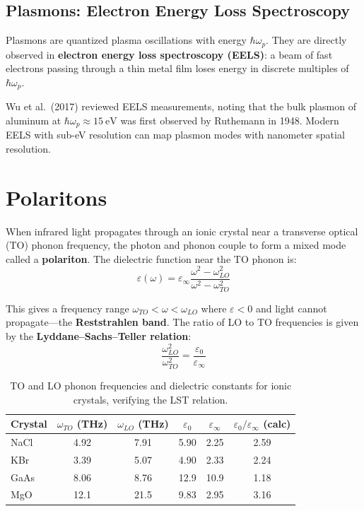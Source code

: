 \subsection{Plasmons: Electron Energy Loss Spectroscopy}

Plasmons are quantized plasma oscillations with energy $\hbar\omega_p$. They are directly observed in \textbf{electron energy loss spectroscopy (EELS)}: a beam of fast electrons passing through a thin metal film loses energy in discrete multiples of $\hbar\omega_p$.

Wu et al.\ (2017) reviewed EELS measurements, noting that the bulk plasmon of aluminum at $\hbar\omega_p \approx \SI{15}{\electronvolt}$ was first observed by Ruthemann in 1948. Modern EELS with sub-\si{\electronvolt} resolution can map plasmon modes with nanometer spatial resolution.


\section{Polaritons}

When infrared light propagates through an ionic crystal near a transverse optical (TO) phonon frequency, the photon and phonon couple to form a mixed mode called a \textbf{polariton}. The dielectric function near the TO phonon is:
\begin{equation}
  \varepsilon(\omega) = \varepsilon_\infty \frac{\omega^2 - \omega_{LO}^2}{\omega^2 - \omega_{TO}^2}
\end{equation}

This gives a frequency range $\omega_{TO} < \omega < \omega_{LO}$ where $\varepsilon < 0$ and light cannot propagate---the \textbf{Reststrahlen band}. The ratio of LO to TO frequencies is given by the \textbf{Lyddane--Sachs--Teller relation}:
\begin{equation}
  \frac{\omega_{LO}^2}{\omega_{TO}^2} = \frac{\varepsilon_0}{\varepsilon_\infty}
\end{equation}

\begin{table}[H]
\centering
\caption{TO and LO phonon frequencies and dielectric constants for ionic crystals, verifying the LST relation.}
\label{tab:lst}
\begin{tabular}{@{}lSSSSS@{}}
\toprule
Crystal & {$\omega_{TO}$ (\si{\tera\hertz})} & {$\omega_{LO}$ (\si{\tera\hertz})} & {$\varepsilon_0$} & {$\varepsilon_\infty$} & {$\varepsilon_0/\varepsilon_\infty$ (calc)} \\
\midrule
NaCl  & 4.92 & 7.91 & 5.90 & 2.25 & 2.59 \\
KBr   & 3.39 & 5.07 & 4.90 & 2.33 & 2.24 \\
GaAs  & 8.06 & 8.76 & 12.9 & 10.9 & 1.18 \\
MgO   & 12.1 & 21.5 & 9.83 & 2.95 & 3.16 \\
\bottomrule
\end{tabular}
\end{table}


